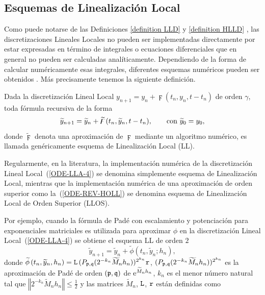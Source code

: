 \subsection{Esquemas de Linealización Local}

Como puede notarse de las Definiciones \ref{definition LLD} y \ref{definition HLLD} , las
discretizaciones Lineales Locales no pueden ser implementadas directamente por
estar expresadas en término de integrales o ecuaciones diferenciales que en general no pueden ser
calculadas analíticamente. Dependiendo de la forma de calcular  numéricamente esas integrales,
 diferentes esquemas numéricos pueden ser obtenidos \cite{Jimenez05AMC,Jimenez13}.
 Más precisamente tenemos la siguiente definición.
\begin{definition}
	\label{definition LLS} Dada la discretización Lineal Local 
	  $y_{n+1}=y_{n}+\digamma(t_{n},y_{n},t-t_{n})$
	 de orden $\gamma $, toda fórmula recursiva de la forma 
	\begin{equation*}
	 \widetilde{y}_{n+1}=\widetilde{y}_{n}+\widetilde{\digamma}(t_{n},\widetilde{y}_{n},t-t_{n})
	 , \text{ \ \ \ \
		\ con }\widetilde{y}_{0}=y_{0},
	\end{equation*}%
	donde $\widetilde{\digamma}$ denota una aproximación
	de $\digamma$ mediante un algoritmo numérico, es
	llamada genéricamente esquema de Linealización Local (LL).
\end{definition}
Regularmente, en la literatura, la implementación numérica de la discretización Lineal Local~(\ref{ODE-LLA-4}) se denomina simplemente esquema de Linealización Local, mientras que la implementación numérica de una aproximación de orden superior como la~(\ref{ODE-REV-HOLL}) se denomina esquema de Linealización Local de Orden Superior (LLOS).

Por ejemplo, cuando la fórmula de Padé con escalamiento y potenciación para exponenciales matriciales \cite{moler2003nineteen} es utilizada para
aproximar $\phi$ en la discretización Lineal Local~(\ref{ODE-LLA-4}) se obtiene el esquema LL de orden $2$ \cite{Jimenez02AMC}
\begin{equation} 
\widetilde{y}_{n+1}=\widetilde{y}_{n}+\widetilde{\phi}\left( t_{n},\widetilde{y}_{n};h_{n}\right), \label{LL-scheme}
\end{equation} 
donde $\widetilde{\phi }\left( t_{n},\widetilde{y}
_{n},h_{n}\right) =\mathtt{L}\,(P_{\mathfrak{p},\mathfrak{q}}(2^{-k_{n}}\widetilde{M}_{n}h_{n}))^{2^{k_{n}}}\mathtt{r}$, 
$(P_{\mathfrak{p},\mathfrak{q}}(2^{-k_{n}}\widetilde{M}_{n}h_{n}))^{2^{k_{n}}}$ es la aproximación
de Padé de orden $(\mathfrak{p},\mathfrak{q})$ de  $\mathrm{e}^{\widetilde{M}_{n}h_{n}}$, $k_{n}$ es el menor número natural tal que $\left\Vert 2^{-k_{n}}\widetilde{M}_{n}h_{n}\right\Vert \leq \frac{1}{2}$ 
y las matrices $\widetilde{M}_{n}$, $\mathtt{L}$, $\mathtt{r}$ están definidas como

